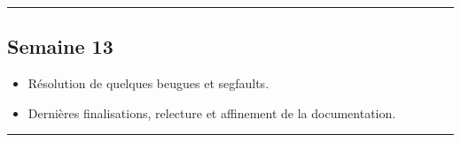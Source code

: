 \documentclass[12pt, letterpaper, twoside]{article}
\begin{document}
\rule{\textwidth}{0.4pt}

\subsection*{Semaine 13}
\begin{itemize}
	\item Résolution de quelques beugues et segfaults.
	\item Dernières finalisations, relecture et affinement de la documentation.
\end{itemize}

\rule{\textwidth}{0.4pt}
\end{document}
